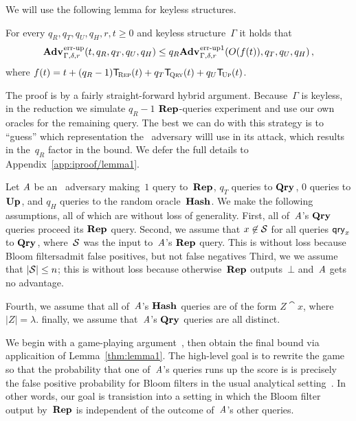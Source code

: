 We will use the following lemma for keyless structures.
%

\begin{lemma}\label{thm:lemma1}
  For every $q_R, q_T, q_U, q_H, r, t \geq 0$ and keyless structure~$\Gamma$ it
  holds that
  \begin{equation*}
    \Adv{\errep}_{\Gamma,\delta,r}(t, q_R, q_T, q_U, q_H) \leq
    q_R\Adv{\errep1}_{\Gamma,\delta,r}(O(f(t)), q_T, q_U, q_H) \,,
  \end{equation*}
  where $f(t) = t + (q_R-1)\ticks(\Rep,t) + q_T\ticks(\Qry,t) + q_U\ticks(\Up,t)$.
\end{lemma}
%
%
\noindent
The proof is by a fairly straight-forward hybrid argument. Because~$\Gamma$ is
keyless, in the reduction we simulate $q_R-1$ $\textup{\textbf{Rep}}\hspace{0.5pt}$-queries experiment and use
our own oracles for the remaining query. The best we can do with this strategy
is to ``guess'' which representation the \errep\ adversary willl use in its
attack, which results in the~$q_R$ factor in the bound.
%
We defer the full details to Appendix~\ref{app:iproof/lemma1}.

Let $\mathit{A}$ be an \errep\ adversary making~$1$ query to~$\textup{\textbf{Rep}}\hspace{0.5pt}$, $q_T$ queries
to $\textup{\textbf{Qry}}\hspace{0.5pt}$, $0$ queries to $\textup{\textbf{Up}}\hspace{0.5pt}$, and $q_H$ queries to the random
oracle~$\textup{\textbf{Hash}}\hspace{0.5pt}$.
%
We make the following assumptions, all of which are without loss of generality.
%
First, all of~$\mathit{A}$'s $\textup{\textbf{Qry}}\hspace{0.5pt}$ queries proceed its $\textup{\textbf{Rep}}\hspace{0.5pt}$ query.
%
Second, we assume that $x\not\in\mathcal{S}$ for all queries $\mathsf{qry}_x$ to $\textup{\textbf{Qry}}\hspace{0.5pt}$,
where~$\mathcal{S}$ was the input to~$\mathit{A}$'s $\textup{\textbf{Rep}}\hspace{0.5pt}$ query. This is without loss
because Bloom filtersadmit false positives, but not false negatives
%
Third, we we assume that $|\mathcal{S}| \leq n$; this is without loss because
otherwise~$\textup{\textbf{Rep}}\hspace{0.5pt}$ outputs~$\bot$ and~$\mathit{A}$ gets no advantage.

Fourth, we assume that all of~$\mathit{A}$'s $\textup{\textbf{Hash}}\hspace{0.5pt}$ queries are of the form $Z\cat
x$, where $|Z| = \lambda$.
%
finally, we assume that~$\mathit{A}$'s $\textup{\textbf{Qry}}\hspace{0.5pt}$ queries are all distinct.

We begin with a game-playing argument~\cite{bellare2006triple}, then obtain the
final bound via applicaition of Lemma~\ref{thm:lemma1}.
%
%
The high-level goal is to rewrite the game so that the probability that one
of~$\mathit{A}$'s queries runs up the score is is precisely the false positive
probability for Bloom filters in the usual analytical
setting~\cite{kirsch2006less}. In other words, our goal is transistion into a
setting in which the Bloom filter output by~$\textup{\textbf{Rep}}\hspace{0.5pt}$ is independent of the
outcome of~$\mathit{A}$'s other queries.


